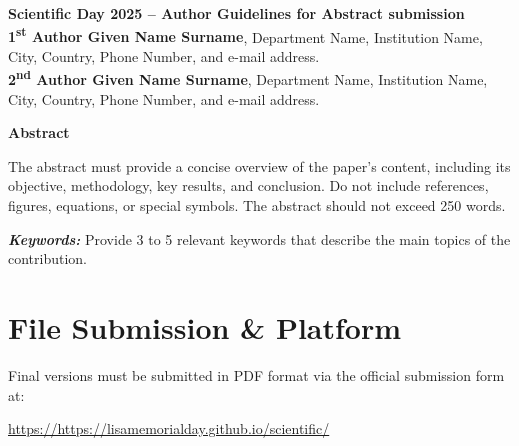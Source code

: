 \documentclass[11pt,a4paper]{article}
\begin{document}
	
	\begin{center}
		{\Large\bfseries Scientific Day 2025 -- Author Guidelines for Abstract submission}\\[1em]
		\textbf{1\textsuperscript{st} Author Given Name Surname}, Department Name, Institution Name, City, Country, Phone Number, and e-mail address.\\
		\textbf{2\textsuperscript{nd} Author Given Name Surname}, Department Name, Institution Name, City, Country, Phone Number, and e-mail address.
	\end{center}
	
	\vspace{1.5em}
	\begin{center}
		\textbf{Abstract}
	\end{center}
	
	\noindent
	The abstract must provide a concise overview of the paper’s content, including its objective, methodology, key results, and conclusion. Do not include references, figures, equations, or special symbols. The abstract should not exceed 250 words.
	
	\vspace{1em}
	\noindent\textbf{\textit{Keywords:}} Provide 3 to 5 relevant keywords that describe the main topics of the contribution.
	
	\vspace{1.5em}
	\section*{File Submission \& Platform}
	Final versions must be submitted in PDF format via the official submission form at:
	
	\vspace{0.5em}
	\noindent\href{https://https://lisamemorialday.github.io/scientific/}{https://https://lisamemorialday.github.io/scientific/}
	
\end{document}
